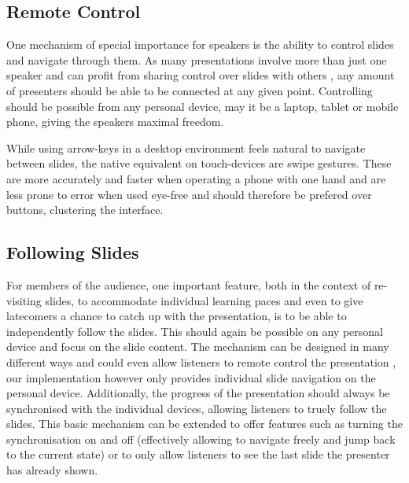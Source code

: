 %

\subsection{Remote Control}
One mechanism of special importance for speakers is the ability to control slides and navigate through them. As many presentations involve more than just one speaker and can profit from sharing control over slides with others \cite{Chattopadhyay:OfficeSocialRemoteControl}, any amount of presenters should be able to be connected at any given point. Controlling should be possible from any personal device, may it be a laptop, tablet or mobile phone, giving the speakers maximal freedom.

While using arrow-keys in a desktop environment feels natural to navigate between slides, the native equivalent on touch-devices are swipe gestures. These are more accurately and faster when operating a phone with one hand \cite{Lai:SingleHandedThumbInteraction} and are less prone to error when used eye-free \cite{Negulescu:TapSwipeMove} and should therefore be prefered over buttons, clustering the interface.

\subsection{Following Slides}
For members of the audience, one important feature, both in the context of re-visiting slides, to accommodate individual learning paces and even to give latecomers a chance to catch up with the presentation, is to be able to independently follow the slides. This should again be possible on any personal device and focus on the slide content. The mechanism can be designed in many different ways and could even allow listeners to remote control the presentation \cite{Chattopadhyay:OfficeSocialRemoteControl}, our implementation however only provides individual slide navigation on the personal device. Additionally, the progress of the presentation should always be synchronised with the individual devices, allowing listeners to truely follow the slides. This basic mechanism can be extended to offer features such as turning the synchronisation on and off (effectively allowing to navigate freely and jump back to the current state) or to only allow listeners to see the last slide the presenter has already shown.

